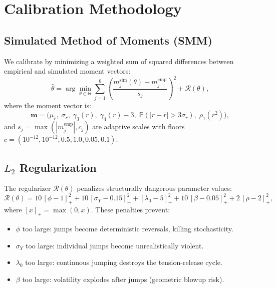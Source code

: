 \documentclass[11pt,a4paper]{article}
\newcommand{\Prob}{\mathbb{P}}
\begin{document}
\section{Calibration Methodology}
\label{sec:calibration}

\subsection{Simulated Method of Moments (SMM)}

We calibrate by minimizing a weighted sum of squared differences between
empirical and simulated moment vectors:
\begin{equation}
  \hat{\theta} = \arg\min_{\theta \in \Theta}
  \sum_{j=1}^{6} \left(\frac{m_j^{\text{sim}}(\theta) - m_j^{\text{emp}}}{s_j}\right)^2
  + \mathcal{R}(\theta),
  \label{eq:smm}
\end{equation}
where the moment vector is:
\begin{equation}
  \mathbf{m} = \bigl(\mu_r,\; \sigma_r,\; \gamma_3(r),\; \gamma_4(r) - 3,\;
  \Prob(|r - \bar{r}| > 3\sigma_r),\; \rho_1(r^2)\bigr),
  \label{eq:moments}
\end{equation}
and $s_j = \max(|m_j^{\text{emp}}|, c_j)$ are adaptive scales with
floors $c = (10^{-12}, 10^{-12}, 0.5, 1.0, 0.05, 0.1)$.

\subsection{$L_2$ Regularization}

The regularizer $\mathcal{R}(\theta)$ penalizes structurally dangerous
parameter values:
\begin{equation}
  \mathcal{R}(\theta) = 10\,[\phi - 1]_+^2 + 10\,[\sigma_Y - 0.15]_+^2
  + [\lambda_0 - 5]_+^2 + 10\,[\beta - 0.05]_+^2 + 2\,[\rho - 2]_+^2,
  \label{eq:penalty}
\end{equation}
where $[x]_+ = \max(0, x)$. These penalties prevent:
\begin{itemize}[nosep]
  \item $\phi$ too large: jumps become deterministic reversals, killing stochasticity.
  \item $\sigma_Y$ too large: individual jumps become unrealistically violent.
  \item $\lambda_0$ too large: continuous jumping destroys the tension-release cycle.
  \item $\beta$ too large: volatility explodes after jumps (geometric blowup risk).
\end{itemize}
\end{document}
